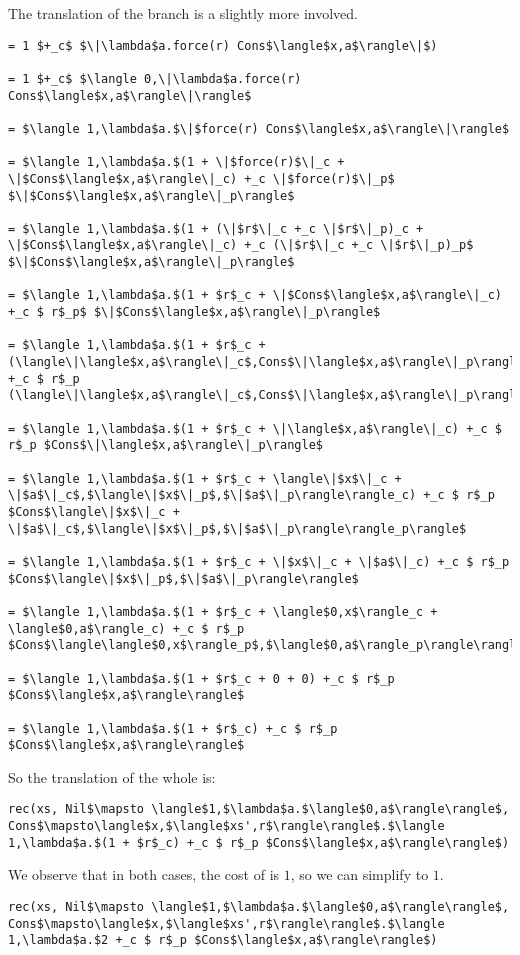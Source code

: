 The translation of the  branch is a slightly more involved.
%
\begin{lstlisting}
= 1 $+_c$ $\|\lambda$a.force(r) Cons$\langle$x,a$\rangle\|$)

= 1 $+_c$ $\langle 0,\|\lambda$a.force(r) Cons$\langle$x,a$\rangle\|\rangle$

= $\langle 1,\lambda$a.$\|$force(r) Cons$\langle$x,a$\rangle\|\rangle$

= $\langle 1,\lambda$a.$(1 + \|$force(r)$\|_c + \|$Cons$\langle$x,a$\rangle\|_c) +_c \|$force(r)$\|_p$ $\|$Cons$\langle$x,a$\rangle\|_p\rangle$

= $\langle 1,\lambda$a.$(1 + (\|$r$\|_c +_c \|$r$\|_p)_c + \|$Cons$\langle$x,a$\rangle\|_c) +_c (\|$r$\|_c +_c \|$r$\|_p)_p$ $\|$Cons$\langle$x,a$\rangle\|_p\rangle$

= $\langle 1,\lambda$a.$(1 + $r$_c + \|$Cons$\langle$x,a$\rangle\|_c) +_c $ r$_p$ $\|$Cons$\langle$x,a$\rangle\|_p\rangle$

= $\langle 1,\lambda$a.$(1 + $r$_c + (\langle\|\langle$x,a$\rangle\|_c$,Cons$\|\langle$x,a$\rangle\|_p\rangle)_c) +_c $ r$_p (\langle\|\langle$x,a$\rangle\|_c$,Cons$\|\langle$x,a$\rangle\|_p\rangle)_p\rangle$

= $\langle 1,\lambda$a.$(1 + $r$_c + \|\langle$x,a$\rangle\|_c) +_c $ r$_p $Cons$\|\langle$x,a$\rangle\|_p\rangle$

= $\langle 1,\lambda$a.$(1 + $r$_c + \langle\|$x$\|_c + \|$a$\|_c$,$\langle\|$x$\|_p$,$\|$a$\|_p\rangle\rangle_c) +_c $ r$_p $Cons$\langle\|$x$\|_c + \|$a$\|_c$,$\langle\|$x$\|_p$,$\|$a$\|_p\rangle\rangle_p\rangle$

= $\langle 1,\lambda$a.$(1 + $r$_c + \|$x$\|_c + \|$a$\|_c) +_c $ r$_p $Cons$\langle\|$x$\|_p$,$\|$a$\|_p\rangle\rangle$

= $\langle 1,\lambda$a.$(1 + $r$_c + \langle$0,x$\rangle_c + \langle$0,a$\rangle_c) +_c $ r$_p $Cons$\langle\langle$0,x$\rangle_p$,$\langle$0,a$\rangle_p\rangle\rangle$

= $\langle 1,\lambda$a.$(1 + $r$_c + 0 + 0) +_c $ r$_p $Cons$\langle$x,a$\rangle\rangle$

= $\langle 1,\lambda$a.$(1 + $r$_c) +_c $ r$_p $Cons$\langle$x,a$\rangle\rangle$
\end{lstlisting}
%
So the translation of the whole  is:
%
\begin{lstlisting}
rec(xs, Nil$\mapsto \langle$1,$\lambda$a.$\langle$0,a$\rangle\rangle$, Cons$\mapsto\langle$x,$\langle$xs',r$\rangle\rangle$.$\langle 1,\lambda$a.$(1 + $r$_c) +_c $ r$_p $Cons$\langle$x,a$\rangle\rangle$)
\end{lstlisting}
%
We observe that in both cases, the cost of  is $1$, so we can simplify  to $1$.
%
\begin{lstlisting}
rec(xs, Nil$\mapsto \langle$1,$\lambda$a.$\langle$0,a$\rangle\rangle$, Cons$\mapsto\langle$x,$\langle$xs',r$\rangle\rangle$.$\langle 1,\lambda$a.$2 +_c $ r$_p $Cons$\langle$x,a$\rangle\rangle$)
\end{lstlisting}
%

